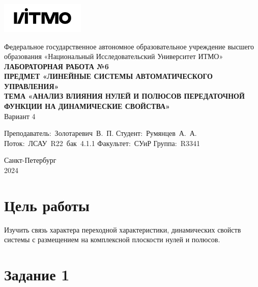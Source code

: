 \documentclass[a4paper, 12pt]{article}
\begin{document}
    \begin{titlepage}

        \begin{center}
        \includegraphics[width=0.3\textwidth]{itmo.png} %
        \vfill
        
        Федеральное государственное автономное образовательное учреждение высшего образования
        «Национальный Исследовательский Университет ИТМО»\\
        
        \vfill
        {\large\bf ЛАБОРАТОРНАЯ РАБОТА №6}\\
        {\large\bf ПРЕДМЕТ «ЛИНЕЙНЫЕ СИСТЕМЫ АВТОМАТИЧЕСКОГО УПРАВЛЕНИЯ»}\\
        {\large\bf ТЕМА «АНАЛИЗ ВЛИЯНИЯ НУЛЕЙ И ПОЛЮСОВ ПЕРЕДАТОЧНОЙ ФУНКЦИИ НА ДИНАМИЧЕСКИЕ СВОЙСТВА»}\\
        Вариант 4
        \vfill

        \begin{flushright}
            \begin{minipage}{.45\textwidth}
            {
                \hbox{Преподаватель: Золотаревич В. П.}
                \hbox{Студент: Румянцев А. А.}
                \hbox{Поток: ЛСАУ R22 бак 4.1.1}
                \hbox{}
                \hbox{Факультет: СУиР}
                \hbox{Группа: R3341}
            }
            \end{minipage}
        \end{flushright}
        
        \vfill
                
        Санкт-Петербург\\
        2024
        \end{center}
    \end{titlepage}
    
    \tableofcontents

    \newpage
    \section{Цель работы}
    Изучить связь характера переходной характеристики,
    динамических свойств системы с размещением на комплексной
    плоскости нулей и полюсов.


    \section{Задание 1}
\end{document}
